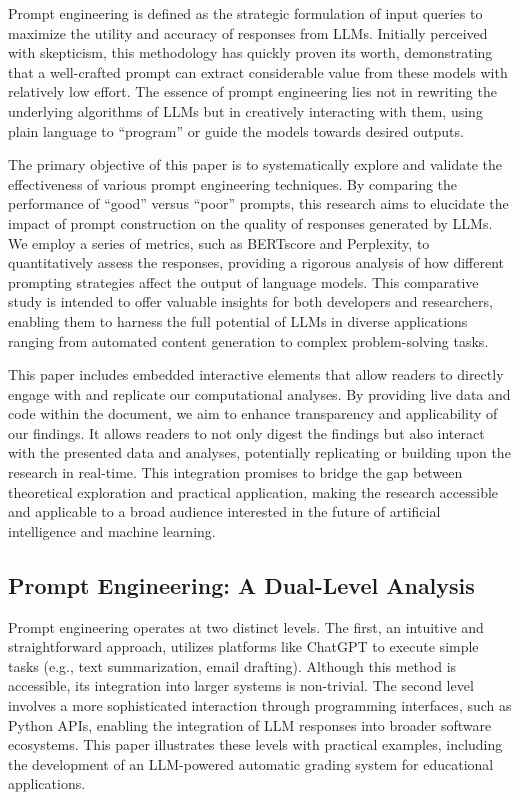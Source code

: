 \documentclass[
]{agujournal2019}
\begin{document}
Prompt engineering is defined as the strategic formulation of input
queries to maximize the utility and accuracy of responses from LLMs.
Initially perceived with skepticism, this methodology has quickly proven
its worth, demonstrating that a well-crafted prompt can extract
considerable value from these models with relatively low effort. The
essence of prompt engineering lies not in rewriting the underlying
algorithms of LLMs but in creatively interacting with them, using plain
language to ``program'' or guide the models towards desired outputs.

The primary objective of this paper is to systematically explore and
validate the effectiveness of various prompt engineering techniques. By
comparing the performance of ``good'' versus ``poor'' prompts, this
research aims to elucidate the impact of prompt construction on the
quality of responses generated by LLMs. We employ a series of metrics,
such as BERTscore and Perplexity, to quantitatively assess the
responses, providing a rigorous analysis of how different prompting
strategies affect the output of language models. This comparative study
is intended to offer valuable insights for both developers and
researchers, enabling them to harness the full potential of LLMs in
diverse applications ranging from automated content generation to
complex problem-solving tasks.

This paper includes embedded interactive elements that allow readers to
directly engage with and replicate our computational analyses. By
providing live data and code within the document, we aim to enhance
transparency and applicability of our findings. It allows readers to not
only digest the findings but also interact with the presented data and
analyses, potentially replicating or building upon the research in
real-time. This integration promises to bridge the gap between
theoretical exploration and practical application, making the research
accessible and applicable to a broad audience interested in the future
of artificial intelligence and machine learning.

\subsection{Prompt Engineering: A Dual-Level
Analysis}\label{prompt-engineering-a-dual-level-analysis}

Prompt engineering operates at two distinct levels. The first, an
intuitive and straightforward approach, utilizes platforms like ChatGPT
to execute simple tasks (e.g., text summarization, email drafting).
Although this method is accessible, its integration into larger systems
is non-trivial. The second level involves a more sophisticated
interaction through programming interfaces, such as Python APIs,
enabling the integration of LLM responses into broader software
ecosystems. This paper illustrates these levels with practical examples,
including the development of an LLM-powered automatic grading system for
educational applications.
\end{document}
